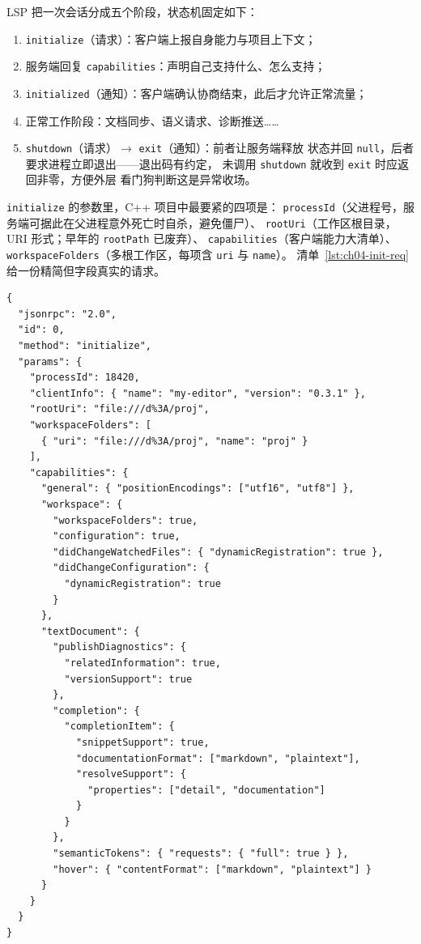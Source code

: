 \documentclass[12pt,a4paper,fontset=fandol]{ctexbook}
\newcommand{\Lang}[1]{\textsf{#1}}
\newcommand{\CPP}{\Lang{C++}}
\begin{document}
LSP 把一次会话分成五个阶段，状态机固定如下：
\begin{enumerate}
  \item \texttt{initialize}（请求）：客户端上报自身能力与项目上下文；
  \item 服务端回复 \texttt{capabilities}：声明自己支持什么、怎么支持；
  \item \texttt{initialized}（通知）：客户端确认协商结束，此后才允许正常流量；
  \item 正常工作阶段：文档同步、语义请求、诊断推送……
  \item \texttt{shutdown}（请求）$\to$ \texttt{exit}（通知）：前者让服务端释放
        状态并回 \texttt{null}，后者要求进程立即退出——退出码有约定，
        未调用 \texttt{shutdown} 就收到 \texttt{exit} 时应返回非零，方便外层
        看门狗判断这是异常收场。
\end{enumerate}

\texttt{initialize} 的参数里，\CPP{} 项目中最要紧的四项是：
\texttt{processId}（父进程号，服务端可据此在父进程意外死亡时自杀，避免僵尸）、
\texttt{rootUri}（工作区根目录，URI 形式；早年的 \texttt{rootPath} 已废弃）、
\texttt{capabilities}（客户端能力大清单）、
\texttt{workspaceFolders}（多根工作区，每项含 \texttt{uri} 与 \texttt{name}）。
清单~\ref{lst:ch04-init-req} 给一份精简但字段真实的请求。

\begin{lstlisting}[style=jsonstyle,caption={initialize 请求（客户端 $\to$ 服务端）节选},label={lst:ch04-init-req}]
{
  "jsonrpc": "2.0",
  "id": 0,
  "method": "initialize",
  "params": {
    "processId": 18420,
    "clientInfo": { "name": "my-editor", "version": "0.3.1" },
    "rootUri": "file:///d%3A/proj",
    "workspaceFolders": [
      { "uri": "file:///d%3A/proj", "name": "proj" }
    ],
    "capabilities": {
      "general": { "positionEncodings": ["utf16", "utf8"] },
      "workspace": {
        "workspaceFolders": true,
        "configuration": true,
        "didChangeWatchedFiles": { "dynamicRegistration": true },
        "didChangeConfiguration": {
          "dynamicRegistration": true
        }
      },
      "textDocument": {
        "publishDiagnostics": {
          "relatedInformation": true,
          "versionSupport": true
        },
        "completion": {
          "completionItem": {
            "snippetSupport": true,
            "documentationFormat": ["markdown", "plaintext"],
            "resolveSupport": {
              "properties": ["detail", "documentation"]
            }
          }
        },
        "semanticTokens": { "requests": { "full": true } },
        "hover": { "contentFormat": ["markdown", "plaintext"] }
      }
    }
  }
}
\end{lstlisting}
\end{document}
